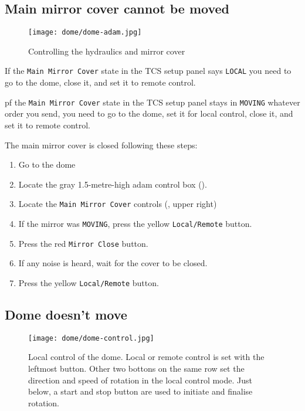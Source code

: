 \documentclass[11pt,fleqn,a4paper]{book}
\begin{document}
\subsection{Main mirror cover cannot be moved}
\begin{figure}
\centering
\texttt{[image: dome/dome-adam.jpg]}
\caption{Controlling the hydraulics and mirror cover}
\label{fig:dome-adam}
\end{figure}

If the \texttt{Main Mirror Cover} state in the \gls{TCS setup panel} says
\texttt{LOCAL} you need to go to the dome, close it, and set it
to remote control.

pf the \texttt{Main Mirror Cover} state in the \gls{TCS setup panel} stays in
\texttt{MOVING} whatever order you send, you need to go to the dome, set it for local control, close it, and set it to remote control.
 

\label{proc:mainmirrorstuck}
The \gls{main mirror} cover is closed following these steps:
\begin{enumerate}
   \item Go to the \gls{dome}
   \item Locate the gray 1.5-metre-high \gls{adam} control box ().
   \item Locate the \texttt{Main Mirror Cover} controls (, upper right) 
   \item If the mirror was \texttt{MOVING}, press the yellow \texttt{Local/Remote} button.
   \item Press the red \texttt{Mirror Close} button.
   \item If any noise is heard, wait for the cover to be closed.
   \item Press the yellow \texttt{Local/Remote} button.
\end{enumerate} 


\subsection{Dome doesn't move}
\begin{figure}
\centering
\texttt{[image: dome/dome-control.jpg]}
\caption[Local control of the dome]{Local control of the \gls{dome}.  Local or remote control is set with the leftmost button.  Other two bottons on the same row set the direction and speed of rotation in the local control mode.  Just below, a start and stop button are used to initiate and finalise rotation.}
\label{fig:dome-control}
\end{figure}
\end{document}
